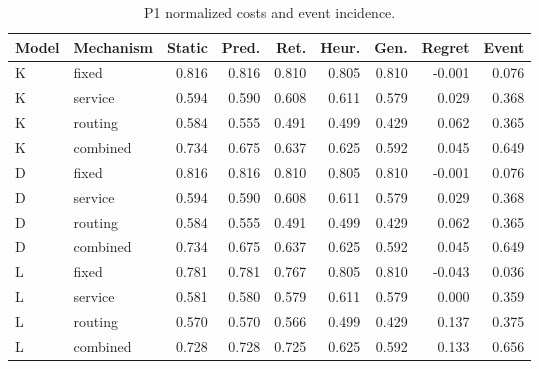 \begin{table}[htbp]\caption{P1 normalized costs and event incidence.}\centering\small\setlength{\tabcolsep}{3pt}

\begin{tabular}{llrrrrrrr}\toprule

Model & Mechanism & Static & Pred. & Ret. & Heur. & Gen. & Regret & Event\\\midrule

K & fixed & 0.816 & 0.816 & 0.810 & 0.805 & 0.810 & -0.001 & 0.076\\

K & service & 0.594 & 0.590 & 0.608 & 0.611 & 0.579 & 0.029 & 0.368\\

K & routing & 0.584 & 0.555 & 0.491 & 0.499 & 0.429 & 0.062 & 0.365\\

K & combined & 0.734 & 0.675 & 0.637 & 0.625 & 0.592 & 0.045 & 0.649\\

D & fixed & 0.816 & 0.816 & 0.810 & 0.805 & 0.810 & -0.001 & 0.076\\

D & service & 0.594 & 0.590 & 0.608 & 0.611 & 0.579 & 0.029 & 0.368\\

D & routing & 0.584 & 0.555 & 0.491 & 0.499 & 0.429 & 0.062 & 0.365\\

D & combined & 0.734 & 0.675 & 0.637 & 0.625 & 0.592 & 0.045 & 0.649\\

L & fixed & 0.781 & 0.781 & 0.767 & 0.805 & 0.810 & -0.043 & 0.036\\

L & service & 0.581 & 0.580 & 0.579 & 0.611 & 0.579 & 0.000 & 0.359\\

L & routing & 0.570 & 0.570 & 0.566 & 0.499 & 0.429 & 0.137 & 0.375\\

L & combined & 0.728 & 0.728 & 0.725 & 0.625 & 0.592 & 0.133 & 0.656\\

\bottomrule\end{tabular}\end{table}

